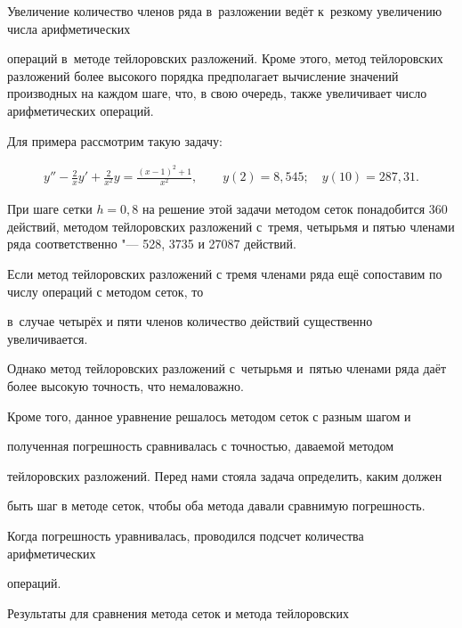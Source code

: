 

%

Увеличение количество членов ряда в~разложении ведёт к~резкому увеличению числа арифметических

операций в~методе тейлоровских разложений.  Кроме этого, метод тейлоровских разложений более высокого порядка предполагает вычисление значений производных на каждом шаге, что, в свою очередь, также увеличивает число арифметических операций.





Для примера рассмотрим такую задачу:

\begin{gather*}

 y''-\frac{2}{x}y'+\frac{2}{x^2}y=\frac{(x-1)^2+1}{x^2}, \qquad  y(2)=8,545; \quad y(10)=287,31.

\end{gather*}

При шаге сетки $h=0,8$ на решение этой задачи методом сеток понадобится 360 действий, методом тейлоровских разложений с~тремя, четырьмя и пятью членами ряда соответственно "--- 528, 3735 и 27087 действий.



Если метод тейлоровских разложений с тремя членами ряда ещё сопоставим по числу операций с методом сеток, то

в~случае четырёх и пяти членов количество действий существенно увеличивается. 

Однако метод тейлоровских разложений с~четырьмя и~пятью членами ряда даёт более высокую точность, что немаловажно.



Кроме того, данное уравнение решалось методом сеток с разным шагом и

полученная погрешность сравнивалась с точностью, даваемой методом

тейлоровских разложений. Перед нами стояла задача определить, каким должен

быть шаг в методе сеток, чтобы оба метода давали сравнимую погрешность.

Когда погрешность уравнивалась, проводился подсчет количества арифметических

операций.



Результаты для сравнения метода сеток и метода тейлоровских

